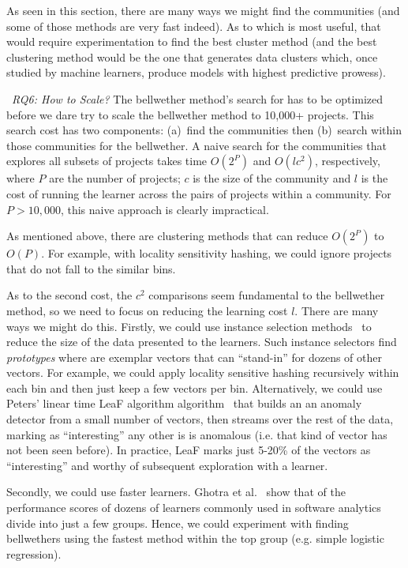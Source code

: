 As seen in this section, 
there are many ways we might find the communities (and some of those methods are very fast indeed). As to which is most useful, that would require experimentation to find the best cluster method (and the best clustering method would be the one that generates data clusters which, once studied by machine learners, produce models with highest predictive prowess).


 

~{\em  RQ6: How to Scale?} The bellwether method's search for  has to be optimized
before we dare try to scale the bellwether method to 10,000+ projects. This search cost has two components: (a)~find the communities then (b)~search within those communities for the bellwether. A naive search for the  communities that explores all subsets of projects
  takes time $O(2^P)$   and   $O(lc^2)$,  respectively, where $P$ are the number of projects; $c$ is the size of the community and $l$ is the cost
  of running the learner across the pairs of projects within a community.
  For $P>10,000$, this naive approach is clearly impractical.

As mentioned above, there are clustering methods that can reduce
 $O(2^P)$  to $O(P)$. For example, with  locality sensitivity hashing, we could ignore projects
 that do  not fall to the similar bins.
 
 As to the second cost, the $c^2$ comparisons seem fundamental to the bellwether method, so we need to focus on reducing the learning cost $l$.
There are many ways we might do this.
Firstly, we could use instance selection methods~\cite{song2017efficient} to reduce the size of the data presented to the learners.
Such instance selectors find {\em prototypes} where are exemplar vectors that can ``stand-in'' for dozens of other 
vectors. For example, we could apply locality sensitive hashing recursively within each bin and  then just keep
a few vectors per bin. Alternatively, we could use Peters' linear time LeaF algorithm algorithm~\cite{petersLace2Icse15} 
that builds an an anomaly detector from a small number of vectors, then streams over the rest
of the data, marking as ``interesting'' any other is is anomalous (i.e. that kind of vector has not been seen before).
In practice, LeaF marks just  5-20\% of the vectors as ``interesting'' and worthy of subsequent exploration with a learner. 




Secondly, we could use faster learners. Ghotra et al.~\cite{Gh15} 
show that of the performance scores of  dozens of learners commonly used in software analytics divide into just a few groups.
Hence, we could experiment with finding bellwethers using
the fastest method within the top group (e.g. simple logistic regression).

